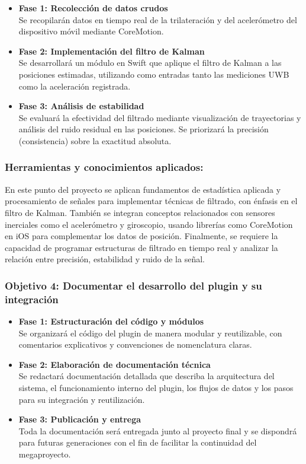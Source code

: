 \begin{itemize}
    \item \textbf{Fase 1: Recolección de datos crudos} \\
    Se recopilarán datos en tiempo real de la trilateración y del acelerómetro del dispositivo móvil mediante CoreMotion.

    \item \textbf{Fase 2: Implementación del filtro de Kalman} \\
    Se desarrollará un módulo en Swift que aplique el filtro de Kalman a las posiciones estimadas, utilizando como entradas tanto las mediciones UWB como la aceleración registrada.

    \item \textbf{Fase 3: Análisis de estabilidad} \\
    Se evaluará la efectividad del filtrado mediante visualización de trayectorias y análisis del ruido residual en las posiciones. Se priorizará la precisión (consistencia) sobre la exactitud absoluta.
\end{itemize}

\subsubsection{Herramientas y conocimientos aplicados:} 
{\justify En este punto del proyecto se aplican fundamentos de estadística aplicada y procesamiento de señales para implementar técnicas de filtrado, con énfasis en el filtro de Kalman. También se integran conceptos relacionados con sensores inerciales como el acelerómetro y giroscopio, usando librerías como CoreMotion en iOS para complementar los datos de posición. Finalmente, se requiere la capacidad de programar estructuras de filtrado en tiempo real y analizar la relación entre precisión, estabilidad y ruido de la señal.}

\subsubsection{Objetivo 4: Documentar el desarrollo del plugin y su integración}

\begin{itemize}
    \item \textbf{Fase 1: Estructuración del código y módulos} \\
    Se organizará el código del plugin de manera modular y reutilizable, con comentarios explicativos y convenciones de nomenclatura claras.

    \item \textbf{Fase 2: Elaboración de documentación técnica} \\
    Se redactará documentación detallada que describa la arquitectura del sistema, el funcionamiento interno del plugin, los flujos de datos y los pasos para su integración y reutilización.

    \item \textbf{Fase 3: Publicación y entrega} \\
    Toda la documentación será entregada junto al proyecto final y se dispondrá para futuras generaciones con el fin de facilitar la continuidad del megaproyecto.
\end{itemize}

